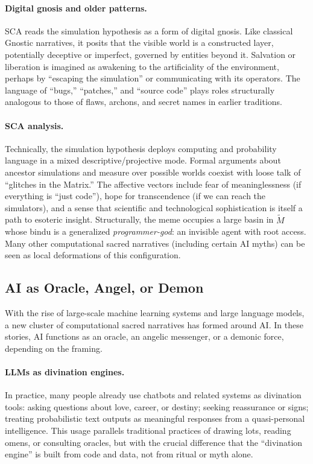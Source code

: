 \documentclass[12]{amsart}
\theoremstyle{plain}
\begin{document}
\paragraph{Digital gnosis and older patterns.} SCA reads the simulation hypothesis as a form of digital gnosis. Like classical Gnostic narratives, it posits that the visible world is a constructed layer, potentially deceptive or imperfect, governed by entities beyond it. Salvation or liberation is imagined as awakening to the artificiality of the environment, perhaps by ``escaping the simulation'' or communicating with its operators. The language of ``bugs,'' ``patches,'' and ``source code'' plays roles structurally analogous to those of flaws, archons, and secret names in earlier traditions.

\paragraph{SCA analysis.} Technically, the simulation hypothesis deploys computing and probability language in a mixed descriptive/projective mode. Formal arguments about ancestor simulations and measure over possible worlds coexist with loose talk of ``glitches in the Matrix.'' The affective vectors include fear of meaninglessness (if everything is ``just code''), hope for transcendence (if we can reach the simulators), and a sense that scientific and technological sophistication is itself a path to esoteric insight. Structurally, the meme occupies a large basin in $\tilde M$ whose bindu is a generalized \emph{programmer-god}: an invisible agent with root access. Many other computational sacred narratives (including certain AI myths) can be seen as local deformations of this configuration.

\subsection{AI as Oracle, Angel, or Demon}

With the rise of large-scale machine learning systems and large language models, a new cluster of computational sacred narratives has formed around AI. In these stories, AI functions as an oracle, an angelic messenger, or a demonic force, depending on the framing.

\paragraph{LLMs as divination engines.} In practice, many people already use chatbots and related systems as divination tools: asking questions about love, career, or destiny; seeking reassurance or signs; treating probabilistic text outputs as meaningful responses from a quasi-personal intelligence. This usage parallels traditional practices of drawing lots, reading omens, or consulting oracles, but with the crucial difference that the ``divination engine'' is built from code and data, not from ritual or myth alone.
\end{document}
